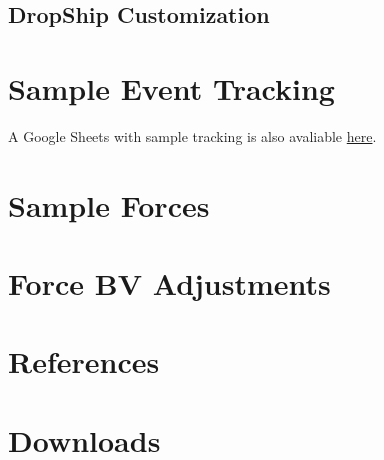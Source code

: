 \documentclass{article}
\newcommand{\mysectiontitle}{}
\newcommand{\newsection}[2]{\renewcommand{\mysectiontitle}{#2}\section{#1}}
\begin{document}


\subsection{DropShip Customization}



\newpage

\newsection{Sample Event Tracking}{sample-tracking-event}
\label{sec:sample_tracking_event}

A Google Sheets with sample tracking is also avaliable \href{https://docs.google.com/spreadsheets/d/17bFS4qAbdIUJQ173NxxHDCCGLD_BG0LDdHGekpoF5M0/copy}{here}.



\newpage

\newsection{Sample Forces}{sample-forces}
\label{sec:sample_forces}



\newpage

\newsection{Force BV Adjustments}{bv-adjustments}
\label{sec:force_bv_adjustments}



\newpage

\newsection{References}{references}
\label{sec:references}



\newpage

\newsection{Downloads}{downloads}
\label{sec:downloads}



\newpage
\end{document}

